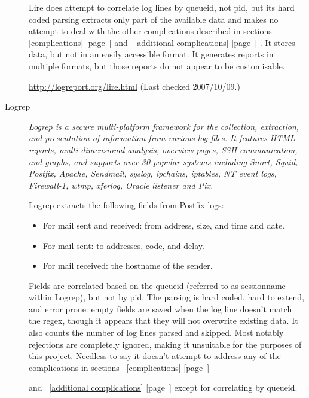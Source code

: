 \documentclass[a4paper,12pt,draft]{article}
\newcommand{\refwithpage}[1]{%
    \empty{}\ref{#1} [page~\pageref{#1}]%
}
\begin{document}
\begin{description}
        Lire does attempt to correlate log lines by queueid, not pid, but
        its hard coded parsing extracts only part of the available data and
        makes no attempt to deal with the other complications described in
        sections~\refwithpage{complications} and~\refwithpage{additional
        complications}.  It stores data, but not in an easily accessible
        format.  It generates reports in multiple formats, but those
        reports do not appear to be customisable.
        
        \url{http://logreport.org/lire.html} \newline (Last checked
        2007/10/09.)

    \item [Logrep] \textit{Logrep is a secure multi-platform framework for
        the collection, extraction, and presentation of information from
        various log files. It features HTML reports, multi dimensional
        analysis, overview pages, SSH communication, and graphs, and
        supports over 30 popular systems including Snort, Squid, Postfix,
        Apache, Sendmail, syslog, ipchains, iptables, NT event logs,
        Firewall-1, wtmp, xferlog, Oracle listener and Pix.\/}

        Logrep extracts the following fields from Postfix logs:

        \begin{itemize}

            \item For mail sent and received: from address, size, and time
                and date.

            \item For mail sent: to addresses, \SMTP{} code, and delay.

            \item For mail received: the hostname of the sender.
                
        \end{itemize}
        
        Fields are correlated based on the queueid (referred to as
        sessionname within Logrep), but not by pid.  The parsing is hard
        coded, hard to extend, and error prone: empty fields are saved when
        the log line doesn't match the regex, though it appears that they
        will not overwrite existing data.  It also counts the number of log
        lines parsed and skipped.  Most notably rejections are completely
        ignored, making it unsuitable for the purposes of this project.
        Needless to say it doesn't attempt to address any of the
        complications in sections~\refwithpage{complications}
        and~\refwithpage{additional complications} except for correlating
        by queueid.


\end{description}
\end{document}
